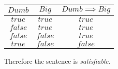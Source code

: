 \begin{center}
\begin{tabular}{| c | c | c |}
\hline
$Dumb$ & $Big$ & $Dumb \implies Big$ \\
\hline
$true$ & $true$ & $true$ \\
\hline
$false$ & $true$ & $true$ \\
\hline
$false$ & $false$ & $true$ \\
\hline
$true$ & $false$ & $false$ \\
\hline
\end{tabular}
\end{center}

Therefore the sentence is \textit{satisfiable}.

%
%
%
%
%
%
%
%
%
